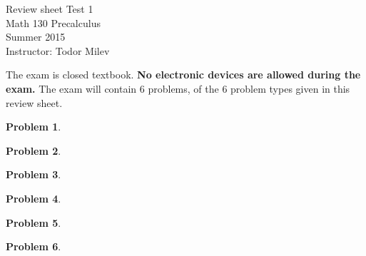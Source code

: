\documentclass{article}
\newtheorem{problem}{Problem}
\begin{document}
\begin{center}
\Large
Review sheet Test 1 \\ Math 130 Precalculus \\ \normalsize Summer 2015 \\ Instructor: Todor Milev
\end{center}



\noindent The exam is closed textbook. \textbf{No electronic devices are allowed during the exam. } The exam will contain 6 problems, of the 6 problem types given in this review sheet. %

\begin{problem}

\end{problem}

\begin{problem}

\end{problem}



\begin{problem}

\end{problem}

\begin{problem}

\end{problem}


\begin{problem}

\end{problem}

\begin{problem}

\end{problem}


\end{document}
